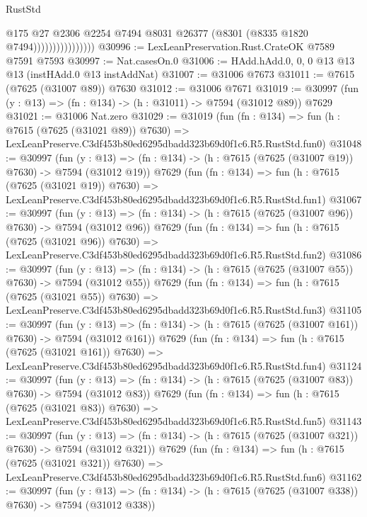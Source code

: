 \begin{lexlean}{RustStd}
\begin{coremodule}
                                @175
                                @27
                                @2306
                                @2254
                                @7494
                                @8031
                                @26377
                                (@8301 (@8335 @1820 @7494))))))))))))))))
@30996 := LexLeanPreservation.Rust.CrateOK @7589 @7591 @7593
@30997 := Nat.casesOn.{0}
@31006 := HAdd.hAdd.{0, 0, 0} @13 @13 @13 (instHAdd.{0} @13 instAddNat)
@31007 := @31006 @7673
@31011 := @7615 (@7625 (@31007 @89)) @7630
@31012 := @31006 @7671
@31019 := @30997 (fun (y : @13) => (fn : @134) -> (h : @31011) -> @7594 (@31012 @89)) @7629
@31021 := @31006 Nat.zero
@31029 := @31019
    (fun (fn : @134) =>
    fun (h : @7615 (@7625 (@31021 @89)) @7630) =>
    LexLeanPreserve.C3df453b80ed6295dbadd323b69d0f1c6.R5.RustStd.fun0)
@31048 := @30997
    (fun (y : @13) => (fn : @134) -> (h : @7615 (@7625 (@31007 @19)) @7630) -> @7594 (@31012 @19))
    @7629
    (fun (fn : @134) =>
    fun (h : @7615 (@7625 (@31021 @19)) @7630) =>
    LexLeanPreserve.C3df453b80ed6295dbadd323b69d0f1c6.R5.RustStd.fun1)
@31067 := @30997
    (fun (y : @13) => (fn : @134) -> (h : @7615 (@7625 (@31007 @96)) @7630) -> @7594 (@31012 @96))
    @7629
    (fun (fn : @134) =>
    fun (h : @7615 (@7625 (@31021 @96)) @7630) =>
    LexLeanPreserve.C3df453b80ed6295dbadd323b69d0f1c6.R5.RustStd.fun2)
@31086 := @30997
    (fun (y : @13) => (fn : @134) -> (h : @7615 (@7625 (@31007 @55)) @7630) -> @7594 (@31012 @55))
    @7629
    (fun (fn : @134) =>
    fun (h : @7615 (@7625 (@31021 @55)) @7630) =>
    LexLeanPreserve.C3df453b80ed6295dbadd323b69d0f1c6.R5.RustStd.fun3)
@31105 := @30997
    (fun (y : @13) => (fn : @134) -> (h : @7615 (@7625 (@31007 @161)) @7630) -> @7594 (@31012 @161))
    @7629
    (fun (fn : @134) =>
    fun (h : @7615 (@7625 (@31021 @161)) @7630) =>
    LexLeanPreserve.C3df453b80ed6295dbadd323b69d0f1c6.R5.RustStd.fun4)
@31124 := @30997
    (fun (y : @13) => (fn : @134) -> (h : @7615 (@7625 (@31007 @83)) @7630) -> @7594 (@31012 @83))
    @7629
    (fun (fn : @134) =>
    fun (h : @7615 (@7625 (@31021 @83)) @7630) =>
    LexLeanPreserve.C3df453b80ed6295dbadd323b69d0f1c6.R5.RustStd.fun5)
@31143 := @30997
    (fun (y : @13) => (fn : @134) -> (h : @7615 (@7625 (@31007 @321)) @7630) -> @7594 (@31012 @321))
    @7629
    (fun (fn : @134) =>
    fun (h : @7615 (@7625 (@31021 @321)) @7630) =>
    LexLeanPreserve.C3df453b80ed6295dbadd323b69d0f1c6.R5.RustStd.fun6)
@31162 := @30997
    (fun (y : @13) => (fn : @134) -> (h : @7615 (@7625 (@31007 @338)) @7630) -> @7594 (@31012 @338))

\end{coremodule}
\end{lexlean}
